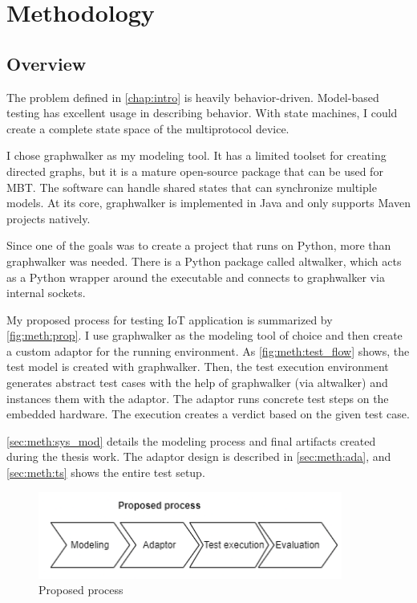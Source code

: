 \chapter{Methodology}
\label{chap:methodology}

\section{Overview}
\label{sec:meth:ov}

The problem defined in \autoref{chap:intro} is heavily behavior-driven. Model-based testing has excellent usage in describing behavior. With state machines, I could create a complete state space of the multiprotocol device.

I chose graphwalker as my modeling tool. It has a limited toolset for creating directed graphs, but it is a mature open-source package that can be used for MBT. The software can handle shared states that can synchronize multiple models. At its core, graphwalker is implemented in Java and only supports Maven projects natively.

Since one of the goals was to create a project that runs on Python, more than graphwalker was needed. There is a Python package called altwalker, which acts as a Python wrapper around the executable and connects to graphwalker via internal sockets.

My proposed process for testing IoT application is summarized by \autoref{fig:meth:prop}. I use graphwalker as the modeling tool of choice and then create a custom adaptor for the running environment. As \autoref{fig:meth:test_flow} shows, the test model is created with graphwalker. Then, the test execution environment generates abstract test cases with the help of graphwalker (via altwalker) and instances them with the adaptor. The adaptor runs concrete test steps on the embedded hardware. The execution creates a verdict based on the given test case.

\autoref{sec:meth:sys_mod} details the modeling process and final artifacts created during the thesis work. The adaptor design is described in \autoref{sec:meth:ada}, and \autoref{sec:meth:ts} shows the entire test setup.

\begin{figure}
    \centering
    \includegraphics[width=100mm, keepaspectratio]{figures/proposed_process.png}
    \caption{Proposed process}
    \label{fig:meth:prop}
\end{figure}

